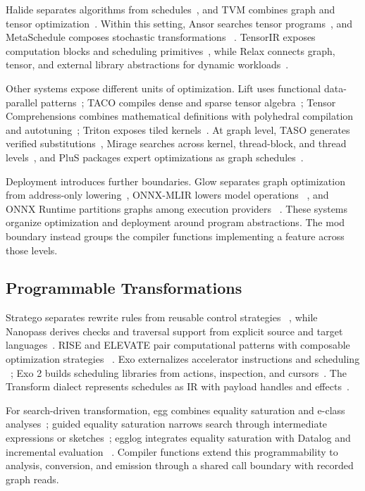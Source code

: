 Halide separates algorithms from schedules~\cite{ragankelley2012halide}, and
TVM combines graph and tensor optimization~\cite{chen2018tvm}. Within this setting,
Ansor searches tensor programs~\cite{zheng2020ansor}, and MetaSchedule composes stochastic transformations
~\cite{shao2022metaschedule}. TensorIR exposes computation blocks and scheduling
primitives~\cite{feng2022tensorir}, while Relax connects graph, tensor, and external
library abstractions for dynamic workloads~\cite{lai2025relax}.

Other systems expose different units of optimization. Lift uses functional
data-parallel patterns~\cite{steuwer2017lift}; TACO compiles dense and sparse tensor
algebra~\cite{kjolstad2017taco}; Tensor Comprehensions combines mathematical
definitions with polyhedral compilation and autotuning~\cite{vasilache2018tc};
Triton exposes tiled kernels~\cite{tillet2019triton}. At graph level, TASO generates
verified substitutions~\cite{jia2019taso}, Mirage searches across kernel,
thread-block, and thread levels~\cite{wu2025mirage}, and PluS packages expert
optimizations as graph schedules~\cite{wu2025plus}.

Deployment introduces further boundaries. Glow separates graph optimization
from address-only lowering~\cite{rotem2019glow}, ONNX-MLIR lowers model operations
~\cite{jin2020onnxmlir}, and ONNX Runtime partitions graphs among execution providers
~\cite{ortarchitecture}. These systems organize optimization and deployment around program abstractions.
The mod boundary instead groups the compiler functions implementing a feature
across those levels.

\subsection{Programmable Transformations}

Stratego separates rewrite rules from reusable control strategies
~\cite{visser2001stratego}, while Nanopass derives checks and traversal support
from explicit source and target languages~\cite{keep2013nanopass}. RISE and
ELEVATE pair computational patterns with composable optimization strategies
~\cite{hagedorn2020elevate}. Exo externalizes accelerator instructions and scheduling
~\cite{ikarashi2022exo}; Exo 2 builds scheduling libraries from actions, inspection,
and cursors~\cite{ikarashi2025exo2}. The Transform dialect represents schedules
as IR with payload handles and effects~\cite{lucke2025transform}.

For search-driven transformation, egg combines equality saturation and
e-class analyses~\cite{willsey2021egg}; guided equality saturation narrows search
through intermediate expressions or sketches~\cite{koehler2024guided}; egglog
integrates equality saturation with Datalog and incremental evaluation
~\cite{zhang2023egglog}. Compiler functions extend this programmability to analysis,
conversion, and emission through a shared call boundary with recorded graph reads.

